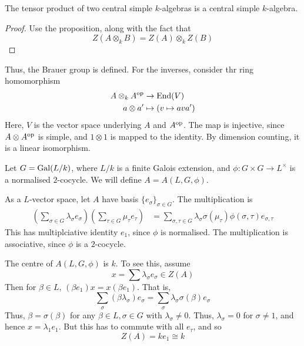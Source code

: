 \documentclass{article}
\begin{document}
\begin{corollary}
    The tensor product of two central simple \(k\)-algebras is a central simple \(k\)-algebra.
\end{corollary}

\begin{proof}
    Use the proposition, along with the fact that
    \[Z(A \otimes_k B) = Z(A) \otimes_k Z(B)\]
\end{proof}

Thus, the Brauer group is defined. For the inverses, consider thr ring homomorphism
\begin{align*}
    A \otimes_k A^{\mathrm{op}} &\to \operatorname{End}(V) \\
    a \otimes a' &\mapsto (v \mapsto ava')
\end{align*}
Here, \(V\) is the vector space underlying \(A\) and \(A^{\mathrm{op}}\). The map is injective, since \(A \otimes A^{\mathrm{op}}\) is simple, and \(1 \otimes 1\) is mapped to the identity. By dimension counting, it is a linear isomorphism.

\begin{definition}
    Let \(G = \operatorname{Gal}(L/k)\), where \(L/k\) is a finite Galois extension, and \(\phi : G \times G \to L^\times\) is a normalised \(2\)-cocycle. We will define \(A = A(L, G, \phi)\).

    As a \(L\)-vector space,  let \(A\) have basis \(\{e_\sigma\}_{\sigma \in G}\). The multiplication is 
    \begin{align*}
        \left(\sum_{\sigma \in G} \lambda_\sigma e_\sigma\right)\left(\sum_{\tau \in G} \mu_\tau e_\tau\right) &= \sum_{\sigma, \tau \in G}\lambda_\sigma \sigma(\mu_\tau)\phi(\sigma, \tau)e_{\sigma, \tau}
    \end{align*}
    This has multiplciative identity \(e_1\), since \(\phi\) is normalised. The multiplication is associative, since \(\phi\) is a \(2\)-cocycle.
\end{definition}

The centre of \(A(L, G, \phi)\) is \(k\). To see this, assume
\[x = \sum\lambda_\sigma e_\sigma \in Z(A)\]
Then for \(\beta \in L\), \((\beta e_1)x = x(\beta e_1)\). That is,
\[\sum_\sigma (\beta \lambda_\sigma)e_\sigma = \sum_\sigma \lambda_\sigma \sigma(\beta)e_\sigma\]
Thus, \(\beta = \sigma(\beta)\) for any \(\beta \in L, \sigma \in G\) with \(\lambda_\sigma \ne 0\). Thus, \(\lambda_\sigma = 0\) for \(\sigma \ne 1\), and hence \(x = \lambda_1 e_1\). But this has to commute with all \(e_\tau\), and so
\[Z(A) = ke_1 \cong k\]
\end{document}
